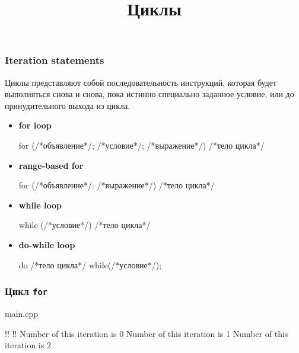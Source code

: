 \documentclass[compress, 8pt, aspectratio=169]{beamer}
\title{Циклы}
\begin{document}
\frame[plain]{\titlepage}

\begin{frame}[fragile]

    \frametitle{Iteration statements}

    \hfill \break

    Циклы представляют собой последовательность инструкций, которая будет
    выполняться снова и снова, пока истинно специально заданное условие,
    или до принудительного выхода из цикла.

    \begin{itemize}

        \item \textbf{for loop}
        \begin{myinplacelisting}[minted language=cpp]
for (/*объявление*/; /*условие*/; /*выражение*/)
{/*тело цикла*/}
        \end{myinplacelisting}

        \item \textbf{range-based for}
        \begin{myinplacelisting}[minted language=cpp]
for (/*объявление*/: /*выражение*/) {/*тело цикла*/}
        \end{myinplacelisting}

        \item \textbf{while loop}
        \begin{myinplacelisting}[minted language=cpp]
while (/*условие*/) {/*тело цикла*/}
        \end{myinplacelisting}

        \item \textbf{do-while loop}
        \begin{myinplacelisting}[minted language=cpp]
do {/*тело цикла*/} while(/*условие*/);
        \end{myinplacelisting}

    \end{itemize}

\end{frame}

\begin{frame}[fragile]

    \frametitle{Цикл \texttt{for}}

        {main.cpp}

    \begin{terminalwindow}
!!
!!
Number of this iteration is 0
Number of this iteration is 1
Number of this iteration is 2
    \end{terminalwindow}

\end{frame}
\end{document}
